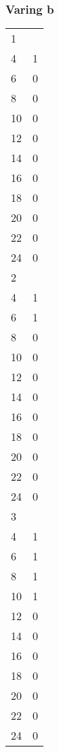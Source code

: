 \documentclass{article}
\begin{document}
\subsubsection{Varing b}
\begin{table}[]
\begin{tabular}{ll}
1  &   \\
4  & 1 \\
6  & 0 \\
8  & 0 \\
10 & 0 \\
12 & 0 \\
14 & 0 \\
16 & 0 \\
18 & 0 \\
20 & 0 \\
22 & 0 \\
24 & 0 \\
2  &   \\
4  & 1 \\
6  & 1 \\
8  & 0 \\
10 & 0 \\
12 & 0 \\
14 & 0 \\
16 & 0 \\
18 & 0 \\
20 & 0 \\
22 & 0 \\
24 & 0 \\
3  &   \\
4  & 1 \\
6  & 1 \\
8  & 1 \\
10 & 1 \\
12 & 0 \\
14 & 0 \\
16 & 0 \\
18 & 0 \\
20 & 0 \\
22 & 0 \\
24 & 0
\end{tabular}
\end{table}
\end{document}
